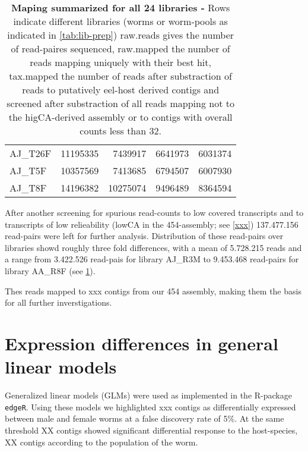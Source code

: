 \begin{table}[h]
\begin{center}
\begin{tabular}{llrrr}
  AJ\_T26F & 11195335 & 7439917 & 6641973 & 6031374 \\ 
  AJ\_T5F & 10357569 & 7413685 & 6794507 & 6007930 \\ 
  AJ\_T8F & 14196382 & 10275074 & 9496489 & 8364594 \\ 
   \hline
\end{tabular}
\caption[Mapping Summary]{\textbf{Maping summarized for all 24
    libraries -} Rows indicate different libraries (worms or
  worm-pools as indicated in \ref{tab:lib-prep}) raw.reads gives the
  number of read-paires sequenced, raw.mapped the number of reads
  mapping uniquely with their best hit, tax.mapped the number of reads
  after substraction of reads to putatively eel-host derived contigs
  and screened after substraction of all reads mapping not to the
  higCA-derived assembly or to contigs with overall counts less than
  32.}
\label{tab:read-clean}
\end{center}
\end{table}

After another screening for spurious read-counts to low covered
transcripts and to transcripts of low relieability (lowCA in the
454-assembly; see \ref{xxx}) 137.477.156 read-pairs were left for
further analysis. Distribution of these read-pairs over libraries
showd roughly three fold differences, with a mean of 5.728.215 reads
and a range from 3.422.526 read-pais for library AJ\_R3M to 9.453.468
read-pairs for library AA\_R8F (see \ref{tab:read-clean}).


Thes reads mapped to xxx contigs from our 454 assembly, making them
the basis for all further inverstigations.

\section{Expression differences in general linear models}

Generalized linear models (GLMs) were used as implemented in the
R-package \texttt{edgeR}. Using these models we highlighted xxx
contigs as differentially expressed between male and female worms at a
false discovery rate of 5\%. At the same threshold XX contigs showed
significant differential response to the host-species, XX contigs
according to the population of the worm.

